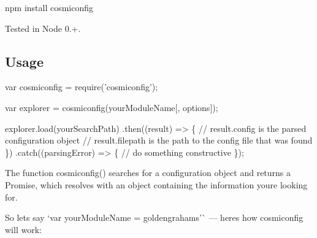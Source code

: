 \begin{DoxyCode}
npm install cosmiconfig
\end{DoxyCode}


Tested in Node 0.+.

\subsection*{Usage}


\begin{DoxyCode}
var cosmiconfig = require('cosmiconfig');

var explorer = cosmiconfig(yourModuleName[, options]);

explorer.load(yourSearchPath)
  .then((result) => \{
    // result.config is the parsed configuration object
    // result.filepath is the path to the config file that was found
  \})
  .catch((parsingError) => \{
    // do something constructive
  \});
\end{DoxyCode}


The function {\ttfamily cosmiconfig()} searches for a configuration object and returns a Promise, which resolves with an object containing the information you\textquotesingle{}re looking for.

So let\textquotesingle{}s say `var your\+Module\+Name = \textquotesingle{}goldengrahams'\`{} — here\textquotesingle{}s how cosmiconfig will work\+:


